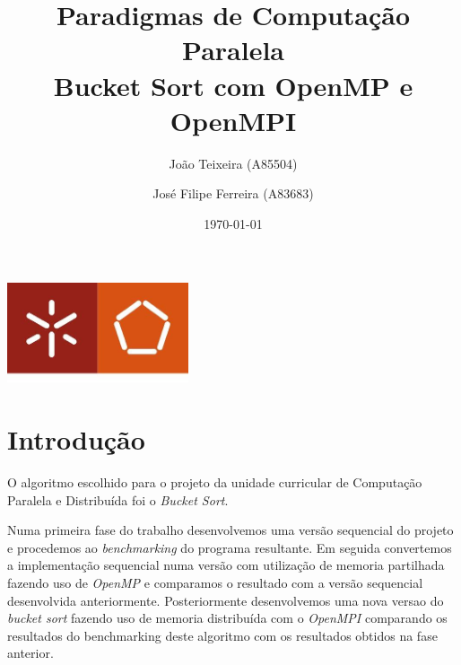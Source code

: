 \documentclass[a4paper]{report}
\begin{document}
\title{Paradigmas de Computação Paralela\\Bucket Sort com OpenMP e OpenMPI}
\author{João Teixeira (A85504) \and José Filipe Ferreira (A83683)}
\date{\today}

\begin{center}
    \begin{minipage}{0.75\linewidth}
        \centering
        \includegraphics[width=0.4\textwidth]{images/eng.jpeg}\par\vspace{1cm}
        \vspace{1.5cm}
        \href{https://www.uminho.pt/PT}
        {\color{black}{\scshape\LARGE Universidade do Minho}} \par
        \vspace{1cm}
        \href{https://www.di.uminho.pt/}
        {\color{black}{\scshape\Large Departamento de Informática}} \par
        \vspace{1.5cm}
        \maketitle
    \end{minipage}
\end{center}

\tableofcontents

\pagebreak

\chapter{Introdução}
O algoritmo escolhido para o projeto da unidade curricular de Computação
Paralela e Distribuída foi o \textit{Bucket Sort}.

Numa primeira fase do trabalho desenvolvemos uma versão sequencial do projeto e
procedemos ao \textit{benchmarking} do programa resultante. Em seguida
convertemos a implementação sequencial numa versão com utilização de memoria
partilhada fazendo uso de \textit{OpenMP} e comparamos o resultado com a versão
sequencial desenvolvida anteriormente. Posteriormente desenvolvemos uma nova
versao do \textit{bucket sort} fazendo uso de memoria distribuída com o
\textit{OpenMPI} comparando os resultados do benchmarking deste algoritmo
com os resultados obtidos na fase anterior.
\end{document}
